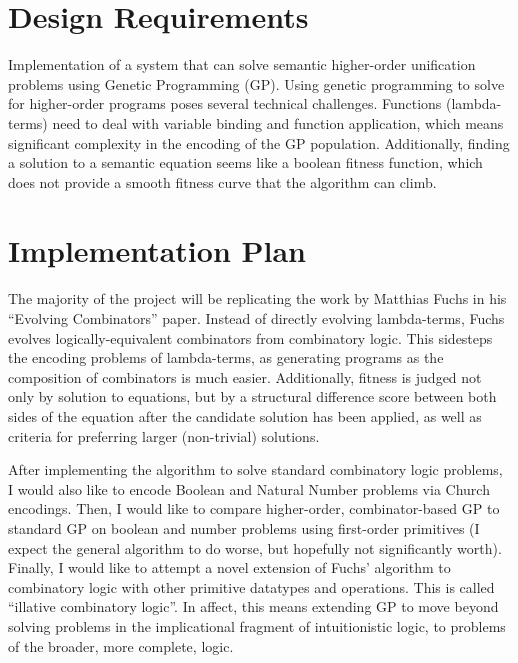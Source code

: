 \documentclass{article}
\begin{document}

\section{Design Requirements}

Implementation of a system that can solve semantic higher-order unification
problems using Genetic Programming (GP). Using genetic programming to
solve for higher-order programs poses several technical challenges.
Functions (lambda-terms) need to deal with variable binding and
function application, which means significant complexity in the
encoding of the GP population. Additionally, finding a solution to a
semantic equation seems like a boolean fitness function, which does
not provide a smooth fitness curve that the algorithm can climb. 

\section{Implementation Plan}

The majority of the project will be replicating the work by Matthias
Fuchs in his ``Evolving Combinators'' paper. Instead of directly
evolving lambda-terms, Fuchs evolves logically-equivalent combinators
from combinatory logic. This sidesteps the encoding problems of
lambda-terms, as generating programs as the composition of combinators
is much easier. Additionally, fitness is judged not only by solution
to equations, but by a structural difference score between both sides
of the equation after the candidate solution has been applied, as well
as criteria for preferring larger (non-trivial) solutions.

After implementing the algorithm to solve standard combinatory logic
problems, I would also like to encode Boolean and Natural Number
problems via Church encodings. Then, I would like to compare
higher-order, combinator-based GP to standard GP on boolean and
number problems using first-order primitives (I expect the general
algorithm to do worse, but hopefully not significantly worth).
Finally, I would like to attempt a novel extension of Fuchs' algorithm
to combinatory logic with other primitive datatypes and operations.
This is called ``illative combinatory logic''. In affect, this means
extending GP to move beyond solving problems in the implicational
fragment of intuitionistic logic, to problems of the broader, more
complete, logic.
\end{document}
